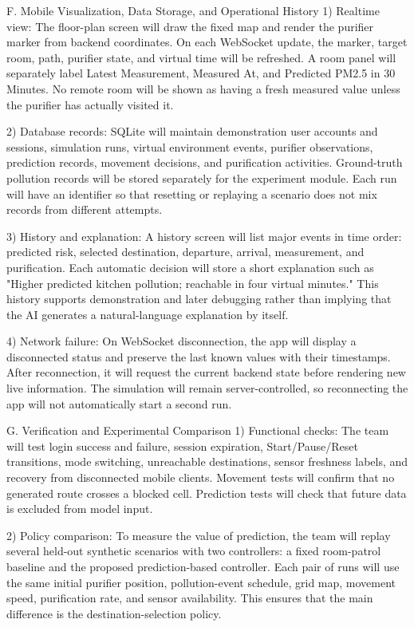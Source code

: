 F. Mobile Visualization, Data Storage, and Operational History
1) Realtime view:
The floor-plan screen will draw the fixed map and render the purifier marker from backend coordinates. On each WebSocket update, the marker, target room, path, purifier state, and virtual time will be refreshed. A room panel will separately label Latest Measurement, Measured At, and Predicted PM2.5 in 30 Minutes. No remote room will be shown as having a fresh measured value unless the purifier has actually visited it.

2) Database records:
SQLite will maintain demonstration user accounts and sessions, simulation runs, virtual environment events, purifier observations, prediction records, movement decisions, and purification activities. Ground-truth pollution records will be stored separately for the experiment module. Each run will have an identifier so that resetting or replaying a scenario does not mix records from different attempts.

3) History and explanation:
A history screen will list major events in time order: predicted risk, selected destination, departure, arrival, measurement, and purification. Each automatic decision will store a short explanation such as "Higher predicted kitchen pollution; reachable in four virtual minutes." This history supports demonstration and later debugging rather than implying that the AI generates a natural-language explanation by itself.

4) Network failure: 
On WebSocket disconnection, the app will display a disconnected status and preserve the last known values with their timestamps. After reconnection, it will request the current backend state before rendering new live information. The simulation will remain server-controlled, so reconnecting the app will not automatically start a second run.

G. Verification and Experimental Comparison
1) Functional checks:
The team will test login success and failure, session expiration, Start/Pause/Reset transitions, mode switching, unreachable destinations, sensor freshness labels, and recovery from disconnected mobile clients. Movement tests will confirm that no generated route crosses a blocked cell. Prediction tests will check that future data is excluded from model input.

2) Policy comparison:
To measure the value of prediction, the team will replay several held-out synthetic scenarios with two controllers: a fixed room-patrol baseline and the proposed prediction-based controller. Each pair of runs will use the same initial purifier position, pollution-event schedule, grid map, movement speed, purification rate, and sensor availability. This ensures that the main difference is the destination-selection policy.

